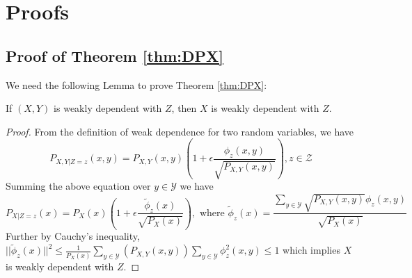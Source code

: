 \section{Proofs}
\subsection{Proof of Theorem \ref{thm:DPX}}
We need the following Lemma to prove Theorem \ref{thm:DPX}:
\begin{lemma}\label{lem:xyz}
	If $(X,Y)$ is weakly dependent with $Z$, then $X$ is weakly dependent with $Z$.
\end{lemma}
\begin{proof}
	From the definition of weak dependence for two random variables, we have
	\begin{equation}
	P_{X,Y|Z=z}(x,y) = P_{X,Y}(x,y)(1+\epsilon \frac{\phi_z(x,y)}{\sqrt{P_{X,Y}(x,y)}}), z \in \mathcal{Z}
	\end{equation}
	Summing the above equation over $y\in \mathcal{Y}$ we have
	\begin{equation}
	P_{X|Z=z}(x) = P_X(x)(1+\epsilon\frac{\tilde{\phi}_z(x)}{\sqrt{P_X(x)}}),
	\textrm{ where } \tilde{\phi}_z(x) = \frac{\sum_{y\in \mathcal{Y}} \sqrt{P_{X,Y}(x,y) }\phi_z(x,y)}{\sqrt{P_X(x)}}
	\end{equation}
	Further by Cauchy's inequality, $||\tilde{\phi}_z(x)||^2 \leq \frac{1}{P_X(x)}
	\sum_{y\in \mathcal{Y}}(P_{X,Y}(x,y))
	\sum_{y\in \mathcal{Y}} \phi_z^2(x,y) \leq 1
	$
	which implies $X$ is weakly dependent with $Z$.
\end{proof}
